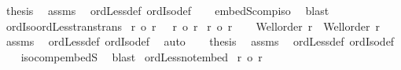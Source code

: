 \begin{isabellebody}
\ {\isacharquery}{\kern0pt}thesis\ \isamarkupfalse%
\ assms\ \isamarkupfalse%
\ ordLess{\isacharunderscore}{\kern0pt}def\ ordIso{\isacharunderscore}{\kern0pt}def\isanewline
\ \ \isamarkupfalse%
\ embedS{\isacharunderscore}{\kern0pt}comp{\isacharunderscore}{\kern0pt}iso\ \isamarkupfalse%
\ blast\isanewline
{}\isamarkupfalse%
%
\endisatagproof
{\isafoldproof}%
%
\isadelimproof
\isanewline
%
\endisadelimproof
\isanewline
{}\isamarkupfalse%
\ ordIso{\isacharunderscore}{\kern0pt}ordLess{\isacharunderscore}{\kern0pt}trans{\isacharbrackleft}{\kern0pt}trans{\isacharbrackright}{\kern0pt}{\isacharcolon}{\kern0pt}\isanewline
{}\ {\isachardoublequoteopen}r\ {\isacharequal}{\kern0pt}o\ r{\isacharprime}{\kern0pt}{\isachardoublequoteclose}\ \ {\isachardoublequoteopen}\ r{\isacharprime}{\kern0pt}\ {\isacharless}{\kern0pt}o\ r{\isacharprime}{\kern0pt}{\isacharprime}{\kern0pt}{\isachardoublequoteclose}\isanewline
{}\ {\isachardoublequoteopen}r\ {\isacharless}{\kern0pt}o\ r{\isacharprime}{\kern0pt}{\isacharprime}{\kern0pt}{\isachardoublequoteclose}\isanewline
%
\isadelimproof
%
\endisadelimproof
%
\isatagproof
{}\isamarkupfalse%
{\isacharminus}{\kern0pt}\isanewline
\ \ \isamarkupfalse%
\ {\isachardoublequoteopen}Well{\isacharunderscore}{\kern0pt}order\ r\ {\isasymand}\ Well{\isacharunderscore}{\kern0pt}order\ r{\isacharprime}{\kern0pt}{\isacharprime}{\kern0pt}{\isachardoublequoteclose}\isanewline
\ \ \isamarkupfalse%
\ assms\ \isamarkupfalse%
\ ordLess{\isacharunderscore}{\kern0pt}def\ ordIso{\isacharunderscore}{\kern0pt}def\ \isamarkupfalse%
\ auto\isanewline
\ \ \isamarkupfalse%
\ {\isacharquery}{\kern0pt}thesis\ \isamarkupfalse%
\ assms\ \isamarkupfalse%
\ ordLess{\isacharunderscore}{\kern0pt}def\ ordIso{\isacharunderscore}{\kern0pt}def\isanewline
\ \ \isamarkupfalse%
\ iso{\isacharunderscore}{\kern0pt}comp{\isacharunderscore}{\kern0pt}embedS\ \isamarkupfalse%
\ blast\isanewline
{}\isamarkupfalse%
%
\endisatagproof
{\isafoldproof}%
%
\isadelimproof
\isanewline
%
\endisadelimproof
\isanewline
{}\isamarkupfalse%
\ ordLess{\isacharunderscore}{\kern0pt}not{\isacharunderscore}{\kern0pt}embed{\isacharcolon}{\kern0pt}\isanewline
{}\ {\isachardoublequoteopen}r\ {\isacharless}{\kern0pt}o\ r{\isacharprime}{\kern0pt}{\isachardoublequoteclose}\isanewline

\end{isabellebody}
